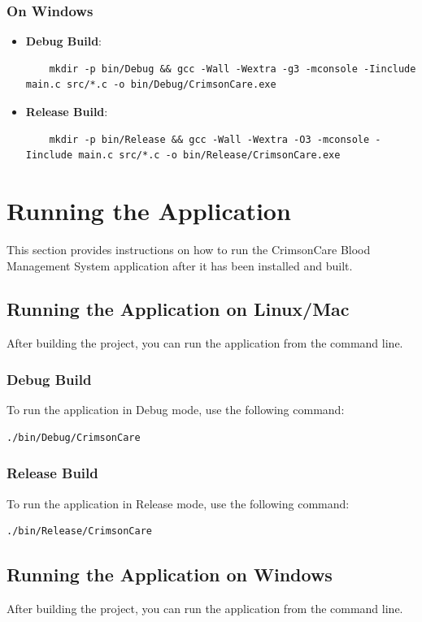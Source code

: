 \documentclass[12pt,a4paper]{report}
\begin{document}
\subsubsection{On Windows}
\begin{itemize}
    \item \normalsize \textbf{Debug Build}:
    \begin{verbatim}
    mkdir -p bin/Debug && gcc -Wall -Wextra -g3 -mconsole -Iinclude main.c src/*.c -o bin/Debug/CrimsonCare.exe
    \end{verbatim}
    \item \normalsize \textbf{Release Build}:
    \begin{verbatim}
    mkdir -p bin/Release && gcc -Wall -Wextra -O3 -mconsole -Iinclude main.c src/*.c -o bin/Release/CrimsonCare.exe
    \end{verbatim}
\end{itemize}

\section{Running the Application}
This section provides instructions on how to run the CrimsonCare Blood Management System application after it has been installed and built.

\subsection{Running the Application on Linux/Mac}
After building the project, you can run the application from the command line.

\subsubsection{Debug Build}
To run the application in Debug mode, use the following command:
\begin{verbatim}
./bin/Debug/CrimsonCare
\end{verbatim}

\subsubsection{Release Build}
To run the application in Release mode, use the following command:
\begin{verbatim}
./bin/Release/CrimsonCare
\end{verbatim}

\subsection{Running the Application on Windows}
After building the project, you can run the application from the command line.
\end{document}
